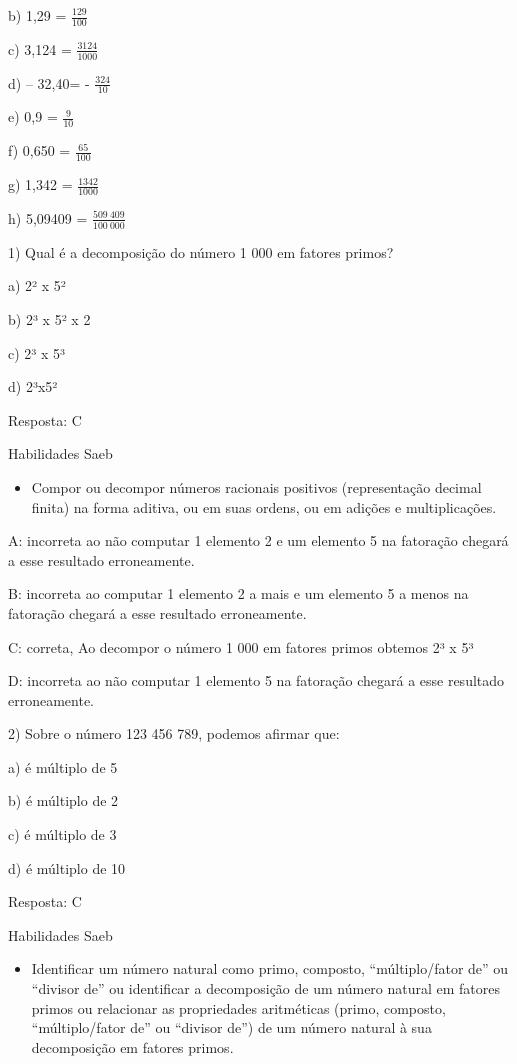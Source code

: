 {b) 1,29 = \(\frac{129}{100}\)

c) 3,124 = \(\frac{3124}{1000}\)

d) -- 32,40= - \(\frac{324}{10}\)

e) 0,9 = \(\frac{9}{10}\)

f) 0,650 = \(\frac{65}{100}\)

g) 1,342 = \(\frac{1342}{1000}\)

h) 5,09409 = \(\frac{509\ 409}{100\ 000}\)


1) Qual é a decomposição do número 1 000 em fatores primos?

a) 2² x 5²

b) 2³ x 5² x 2

c) 2³ x 5³

d) 2³x5²

Resposta: C

Habilidades Saeb

\begin{itemize}
\tightlist
\item
  Compor ou decompor números racionais positivos (representação decimal
  finita) na forma aditiva, ou em suas ordens, ou em adições e
  multiplicações.
\end{itemize}

A: incorreta ao não computar 1 elemento 2 e um elemento 5 na fatoração
chegará a esse resultado erroneamente.

B: incorreta ao computar 1 elemento 2 a mais e um elemento 5 a menos na
fatoração chegará a esse resultado erroneamente.

C: correta, Ao decompor o número 1 000 em fatores primos obtemos 2³ x 5³

D: incorreta ao não computar 1 elemento 5 na fatoração chegará a esse
resultado erroneamente.

2) Sobre o número 123 456 789, podemos afirmar que:

a) é múltiplo de 5

b) é múltiplo de 2

c) é múltiplo de 3

d) é múltiplo de 10

Resposta: C

Habilidades Saeb

\begin{itemize}
\tightlist
\item
  Identificar um número natural como primo, composto, ``múltiplo/fator
  de'' ou ``divisor de'' ou identificar a decomposição de um número
  natural em fatores primos ou relacionar as propriedades aritméticas
  (primo, composto, ``múltiplo/fator de'' ou ``divisor de'') de um
  número natural à sua decomposição em fatores primos.
\end{itemize}

}
